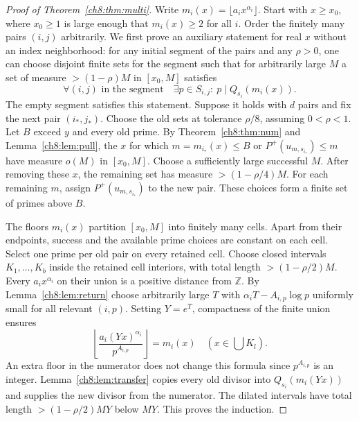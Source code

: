 \documentclass[11pt,a4paper,oneside,openany]{report}
\theoremstyle{remark}\newtheorem{remark}[theorem]{Remark}
\numberwithin{equation}{section}
\newcommand{\Z}{\mathbb Z}\newcommand{\N}{\mathbb N}
\begin{document}
\begin{proof}[Proof of Theorem~\ref{ch8:thm:multi}]
Write $m_i(x)=\lfloor a_i x^{\alpha_i}\rfloor$. Start with $x\ge x_0$, where $x_0\ge1$ is large enough that $m_i(x)\ge2$ for all $i$. Order the finitely many pairs $(i,j)$ arbitrarily. We first prove an auxiliary statement for real $x$ without an index neighborhood: for any initial segment of the pairs and any $\rho>0$, one can choose disjoint finite sets for the segment such that for arbitrarily large $M$ a set of measure $>(1-\rho)M$ in $[x_0,M]$ satisfies
\[
  \forall (i,j)\text{ in the segment}\quad
  \exists p\in S_{i,j}:\ p\mid Q_{s_i}(m_i(x)).
\]
The empty segment satisfies this statement. Suppose it holds with $d$ pairs and fix the next pair $(i_*,j_*)$. Choose the old sets at tolerance $\rho/8$, assuming $0<\rho<1$. Let $B$ exceed $y$ and every old prime. By Theorem~\ref{ch8:thm:num} and Lemma~\ref{ch8:lem:pull}, the $x$ for which $m=m_{i_*}(x)\le B$ or $P^+(u_{m,s_{i_*}})\le m$ have measure $o(M)$ in $[x_0,M]$. Choose a sufficiently large successful $M$. After removing these $x$, the remaining set has measure $>(1-\rho/4)M$. For each remaining $m$, assign $P^+(u_{m,s_{i_*}})$ to the new pair. These choices form a finite set of primes above $B$.

The floors $m_i(x)$ partition $[x_0,M]$ into finitely many cells. Apart from their endpoints, success and the available prime choices are constant on each cell. Select one prime per old pair on every retained cell. Choose closed intervals $K_1,\ldots,K_b$ inside the retained cell interiors, with total length $>(1-\rho/2)M$. Every $a_i x^{\alpha_i}$ on their union is a positive distance from $\Z$. By Lemma~\ref{ch8:lem:return} choose arbitrarily large $T$ with $\alpha_i T-A_{i,p}\log p$ uniformly small for all relevant $(i,p)$. Setting $Y=e^T$, compactness of the finite union ensures
\[
 \left\lfloor\frac{a_i(Yx)^{\alpha_i}}{p^{A_{i,p}}}\right\rfloor=m_i(x)
 \quad(x\in\textstyle\bigcup K_l).
\]
An extra floor in the numerator does not change this formula since $p^{A_{i,p}}$ is an integer. Lemma~\ref{ch8:lem:transfer} copies every old divisor into $Q_{s_i}(m_i(Yx))$ and supplies the new divisor from the numerator. The dilated intervals have total length $>(1-\rho/2)MY$ below $MY$. This proves the induction.


\end{proof}
\end{document}
